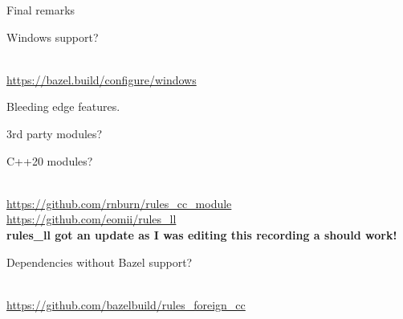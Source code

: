 \documentclass[aspectratio=169]{beamer}
\begin{document}
\begin{frame}{}
    \begin{center}
        \begin{Huge}Final remarks\end{Huge}
    \end{center}
\end{frame}

\begin{frame}{}
    \begin{center}
        \begin{Huge}Windows support?\end{Huge}\\
        \href{https://bazel.build/configure/windows}{https://bazel.build/configure/windows}
    \end{center}
\end{frame}

\begin{frame}{}
    \begin{center}
        \begin{Huge}Bleeding edge features.\end{Huge}
    \end{center}
\end{frame}

\begin{frame}{}
    \begin{center}
        \begin{Huge}3rd party modules?\end{Huge}
    \end{center}
\end{frame}

\begin{frame}{}
    \begin{center}
        \begin{Huge}C++20 modules?\end{Huge}\\
        \href{https://github.com/rnburn/rules_cc_module}{https://github.com/rnburn/rules\_cc\_module}\\
        \href{https://github.com/eomii/rules_ll}{https://github.com/eomii/rules\_ll}\\
        \textbf{rules\_ll got an update as I was editing this recording a should work!}
\end{center}
\end{frame}

\begin{frame}{}
    \begin{center}
        \begin{Huge}Dependencies without Bazel support?\end{Huge}\\
        \href{https://github.com/bazelbuild/rules_foreign_cc}{https://github.com/bazelbuild/rules\_foreign\_cc}
    \end{center}
\end{frame}
\end{document}
